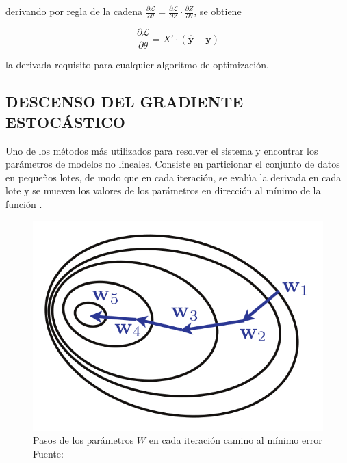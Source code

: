         \noindent derivando por regla de la cadena $\frac{\partial\mathcal{L}}{\partial \theta} = \frac{\partial\mathcal{L}}{\partial Z} \cdot \frac{\partial Z}{\partial \theta}$, se obtiene
        
        \begin{equation}
            \frac{\partial\mathcal{L}}{\partial \theta} = X' \cdot (\mathbf{\hat{y}} - \mathbf{y})
        \end{equation}
        
        \noindent la derivada requisito para cualquier algoritmo de optimización.
        
    \subsection{DESCENSO DEL GRADIENTE ESTOCÁSTICO}
        Uno de los métodos más utilizados para resolver el sistema y encontrar los parámetros de modelos no lineales. Consiste en particionar el conjunto de datos en pequeños lotes, de modo que en cada iteración, se evalúa la derivada en cada lote y se mueven los valores de los parámetros en dirección al mínimo de la función \citep{hastie01statisticallearning}.
        
        \begin{figure}[H]
            \centering
			\includegraphics[scale=0.32]{imagenes/sgd}
            \caption[Pasos de los parámetros $W$ en cada iteración camino al mínimo error]{Pasos de los parámetros $W$ en cada iteración camino al mínimo error\\ Fuente: \citep{10.5555/3360093}}
        \end{figure}
      
